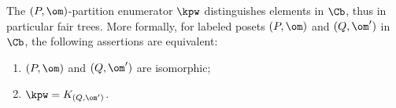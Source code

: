 \begin{theorem}\label{thm:fair-trees}
The $(P,\om)$-partition enumerator $\kpw$ distinguishes elements in $\Cb$, 
thus in particular fair trees. More formally, for labeled posets $(P,\om)$ and $(Q,\om')$ in $\Cb$,
the following assertions are equivalent:
\begin{enumerate}
\item $(P,\om)$ and $(Q,\om')$ are isomorphic;
\item $\kpw=K_{(Q,\om')}$.
\end{enumerate}
\end{theorem}
